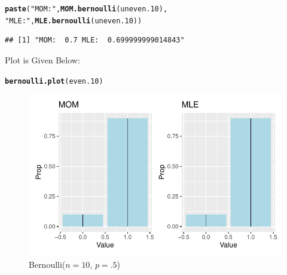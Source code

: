 \documentclass{article}\usepackage[]{graphicx}\usepackage[]{color}
\makeatletter
\def\maxwidth{ %
  \ifdim\Gin@nat@width>\linewidth
    \linewidth
  \else
    \Gin@nat@width
  \fi
}
\newcommand{\hlstr}[1]{\textcolor[rgb]{0.192,0.494,0.8}{#1}}%
\newcommand{\hlstd}[1]{\textcolor[rgb]{0.345,0.345,0.345}{#1}}%
\newcommand{\hlkwd}[1]{\textcolor[rgb]{0.737,0.353,0.396}{\textbf{#1}}}%
\newenvironment{kframe}{%
 \def\at@end@of@kframe{}%
 \ifinner\ifhmode%
  \def\at@end@of@kframe{\end{minipage}}%
  \begin{minipage}{\columnwidth}%
 \fi\fi%
 \def\FrameCommand##1{\hskip\@totalleftmargin \hskip-\fboxsep
 \colorbox{shadecolor}{##1}\hskip-\fboxsep
     \hskip-\linewidth \hskip-\@totalleftmargin \hskip\columnwidth}%
 \MakeFramed {\advance\hsize-\width
   \@totalleftmargin\z@ \linewidth\hsize
   \@setminipage}}%
 {\par\unskip\endMakeFramed%
 \at@end@of@kframe}
\newenvironment{knitrout}{}{} %
\makeatother
\begin{document}
\begin{enumerate}
\begin{enumerate}
\begin{knitrout}
\begin{kframe}
\begin{alltt}
\hlkwd{paste}\hlstd{(}\hlstr{"MOM: "}\hlstd{,} \hlkwd{MOM.bernoulli}\hlstd{(uneven.10),}
      \hlstr{"MLE: "}\hlstd{,} \hlkwd{MLE.bernoulli}\hlstd{(uneven.10))}
\end{alltt}
\begin{verbatim}
## [1] "MOM:  0.7 MLE:  0.699999999014843"
\end{verbatim}
\end{kframe}
\end{knitrout}
Plot is Given Below:
\begin{knitrout}
\color{fgcolor}\begin{kframe}
\begin{alltt}
\hlkwd{bernoulli.plot}\hlstd{(even.10)}
\end{alltt}
\end{kframe}
\end{knitrout}

\begin{figure}[H]
  \begin{center}
\begin{knitrout}
\color{fgcolor}
\includegraphics[width=\maxwidth]{figure/unnamed-chunk-4-1} 
\end{knitrout}
    \caption{Bernoulli($n=10$, $p=.5$)}
    \label{p4plot1}%
  \end{center}
\end{figure}


\end{enumerate}
\end{enumerate}
\end{document}
